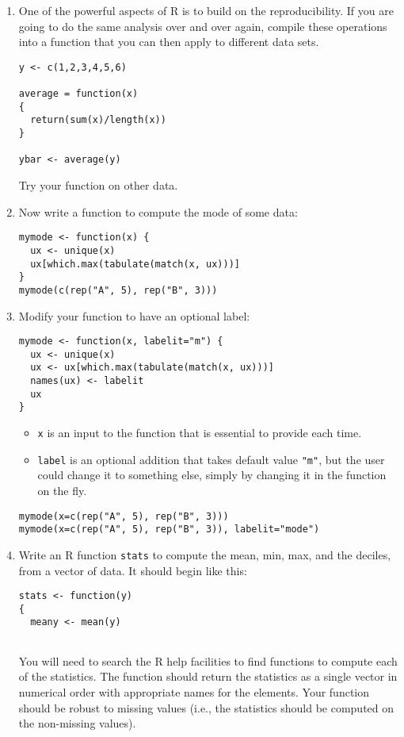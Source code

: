 \documentclass[11pt]{article}
\begin{document}
\begin{enumerate}
\item 
One of the powerful aspects of R is to build on the reproducibility. If you are going to do the same analysis over and over again, compile these operations into a function that you can then apply to different data sets. 

\begin{verbatim}
y <- c(1,2,3,4,5,6)

average = function(x)
{
  return(sum(x)/length(x))
}

ybar <- average(y)
\end{verbatim}
Try your function on other data.


\item Now write a function to compute the mode of some data:

\begin{verbatim}
mymode <- function(x) {
  ux <- unique(x)
  ux[which.max(tabulate(match(x, ux)))]
}
mymode(c(rep("A", 5), rep("B", 3)))
\end{verbatim}

\item Modify your function to have an optional label:
\begin{verbatim}
mymode <- function(x, labelit="m") {
  ux <- unique(x)
  ux <- ux[which.max(tabulate(match(x, ux)))]
  names(ux) <- labelit
  ux
}
\end{verbatim}

\begin{itemize}
\item \verb|x| is an input to the function that is essential to provide each time.
\item \verb|label| is an optional addition that takes default value \verb|"m"|, but the user could change it to something else, simply by changing it in the function on the fly.
\end{itemize}
\begin{verbatim}
mymode(x=c(rep("A", 5), rep("B", 3)))
mymode(x=c(rep("A", 5), rep("B", 3)), labelit="mode")
\end{verbatim}

\item Write an R function \verb|stats| to compute the mean, min, max, and the deciles, from a vector of data. It should begin like this:
\begin{verbatim}
stats <- function(y)
{
  meany <- mean(y)
  
\end{verbatim}
You will need to search the R help facilities to find functions to compute each of the statistics. The function should return the statistics as a single vector in numerical order with appropriate names for the elements. Your function should be robust to missing values (i.e., the statistics should be computed on the non-missing values).


\end{enumerate}
\end{document}
